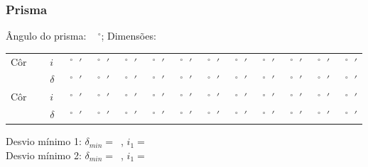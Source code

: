 \documentclass[a4paper,12pt]{article}  %
\begin{document}
\subsubsection{Prisma}


Ângulo do prisma: ~\underline{\makebox[1cm][r]{~}} $^\circ$; Dimensões: ~\underline{\makebox[4cm][r]{~}} 

\begin{center}
	\begin{tabular}{|l|l|r|r|r|r|r|r|r|r|r|r|r|}
	\hline
	\hline
	Côr $\quad$ & $i$  & $\;\;^{\circ}\;\;'$ & $\;\;^{\circ}\;\;'$ & $\;\;^{\circ}\;\;'$ & $\;\;^{\circ}\;\;'$ & $\;\;^{\circ}\;\;'$ & $\;\;^{\circ}\;\;'$ &  $\;\;^{\circ}\;\;'$& $\;\;^{\circ}\;\;'$ &  $\;\;^{\circ}\;\;'$& $\;\;^{\circ}\;\;'$ &  $\;\;^{\circ}\;\;'$  \\ \cline{2-13}
	 &  $\delta$&$\;\;^{\circ}\;\;'$ & $\;\;^{\circ}\;\;'$ & $\;\;^{\circ}\;\;'$ & $\;\;^{\circ}\;\;'$ & $\;\;^{\circ}\;\;'$ & $\;\;^{\circ}\;\;'$ &  $\;\;^{\circ}\;\;'$& $\;\;^{\circ}\;\;'$ &  $\;\;^{\circ}\;\;'$& $\;\;^{\circ}\;\;'$ &  $\;\;^{\circ}\;\;'$\\ \cline{2-13}
	Côr $\quad$ & $i$   & $\;\;^{\circ}\;\;'$ & $\;\;^{\circ}\;\;'$ & $\;\;^{\circ}\;\;'$ & $\;\;^{\circ}\;\;'$ & $\;\;^{\circ}\;\;'$ & $\;\;^{\circ}\;\;'$ &  $\;\;^{\circ}\;\;'$& $\;\;^{\circ}\;\;'$ &  $\;\;^{\circ}\;\;'$& $\;\;^{\circ}\;\;'$ &  $\;\;^{\circ}\;\;'$  \\ \cline{2-13}
	 &  $\delta$&$\;\;^{\circ}\;\;'$ & $\;\;^{\circ}\;\;'$ & $\;\;^{\circ}\;\;'$ & $\;\;^{\circ}\;\;'$ & $\;\;^{\circ}\;\;'$ & $\;\;^{\circ}\;\;'$ &  $\;\;^{\circ}\;\;'$& $\;\;^{\circ}\;\;'$ &  $\;\;^{\circ}\;\;'$& $\;\;^{\circ}\;\;'$ &  $\;\;^{\circ}\;\;'$ \\	\hline
	\hline
 	\end{tabular}
\end{center}

\noindent Desvio mínimo 1:  $\delta_{min}=$~\underline{\makebox[1.5cm][r]{~}}, 
$i_1=$~\underline{\makebox[1.5cm][r]{~}} 
\\
\noindent Desvio mínimo 2:  $\delta_{min}=$~\underline{\makebox[1.5cm][r]{~}}, 
$i_1=$~\underline{\makebox[1.5cm][r]{~}}

\end{document}
